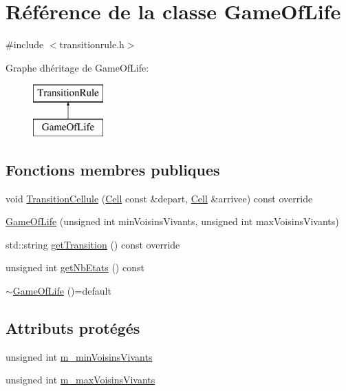 \hypertarget{class_game_of_life}{}\section{Référence de la classe Game\+Of\+Life}
\label{class_game_of_life}


{\ttfamily \#include $<$transitionrule.\+h$>$}

Graphe d\textquotesingle{}héritage de Game\+Of\+Life\+:\begin{figure}[H]
\begin{center}
\leavevmode
\includegraphics[height=2.000000cm]{class_game_of_life}
\end{center}
\end{figure}
\subsection*{Fonctions membres publiques}
\begin{DoxyCompactItemize}
\item 
void \mbox{\hyperlink{class_game_of_life_a12e6db1719e64adc023e1a7d2976d38d}{Transition\+Cellule}} (\mbox{\hyperlink{class_cell}{Cell}} const \&depart, \mbox{\hyperlink{class_cell}{Cell}} \&arrivee) const override
\item 
\mbox{\hyperlink{class_game_of_life_a033f778ad4b391bbf04dfa937f7b11df}{Game\+Of\+Life}} (unsigned int min\+Voisins\+Vivants, unsigned int max\+Voisins\+Vivants)
\item 
std\+::string \mbox{\hyperlink{class_game_of_life_a636421a27cb52e9f7ec161d141809919}{get\+Transition}} () const override
\item 
unsigned int \mbox{\hyperlink{class_game_of_life_afb8e0ee780b7e187266060cf9bec0578}{get\+Nb\+Etats}} () const
\item 
\mbox{\hyperlink{class_game_of_life_a3006eb8600b82f3deff3b8efe6725569}{$\sim$\+Game\+Of\+Life}} ()=default
\end{DoxyCompactItemize}
\subsection*{Attributs protégés}
\begin{DoxyCompactItemize}
\item 
unsigned int \mbox{\hyperlink{class_game_of_life_a851bf99201f554c12cdedf9fa227c321}{m\+\_\+min\+Voisins\+Vivants}}
\item 
unsigned int \mbox{\hyperlink{class_game_of_life_ad10ffab0e8d12ccac18ec5d4bd587fcc}{m\+\_\+max\+Voisins\+Vivants}}
\end{DoxyCompactItemize}


